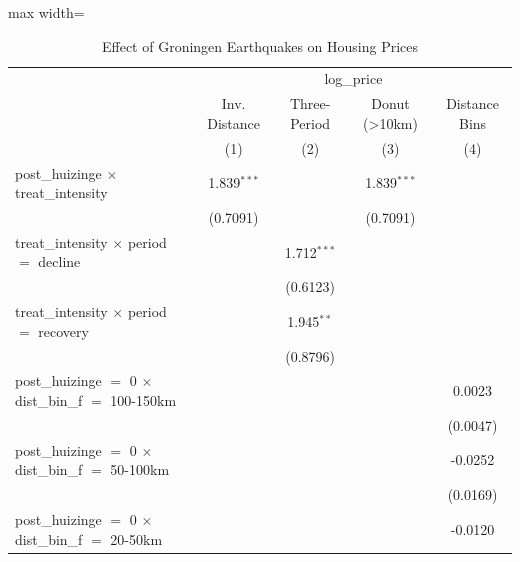 
\begin{table}[htbp]
   \caption{\label{tab:main_did} Effect of Groningen Earthquakes on Housing Prices}
   \bigskip
   \centering
   \begin{adjustbox}{max width=\textwidth}
   \begin{tabular}{lcccc}
      \toprule
       & \multicolumn{4}{c}{log\_price}\\
                                                                   & Inv. Distance & Three-Period  & Donut (>10km) & Distance Bins \\   
                                                                   & (1)           & (2)           & (3)           & (4)\\  
      \midrule 
      post\_huizinge $\times$ treat\_intensity                     & 1.839$^{***}$ &               & 1.839$^{***}$ &   \\   
                                                                   & (0.7091)      &               & (0.7091)      &   \\   
      treat\_intensity $\times$ period $=$ decline                 &               & 1.712$^{***}$ &               &   \\   
                                                                   &               & (0.6123)      &               &   \\   
      treat\_intensity $\times$ period $=$ recovery                &               & 1.945$^{**}$  &               &   \\   
                                                                   &               & (0.8796)      &               &   \\   
      post\_huizinge $=$ 0 $\times$ dist\_bin\_f $=$ 100-150km     &               &               &               & 0.0023\\   
                                                                   &               &               &               & (0.0047)\\   
      post\_huizinge $=$ 0 $\times$ dist\_bin\_f $=$ 50-100km      &               &               &               & -0.0252\\   
                                                                   &               &               &               & (0.0169)\\   
      post\_huizinge $=$ 0 $\times$ dist\_bin\_f $=$ 20-50km       &               &               &               & -0.0120\\   

\end{tabular}
\end{adjustbox}
\end{table}
